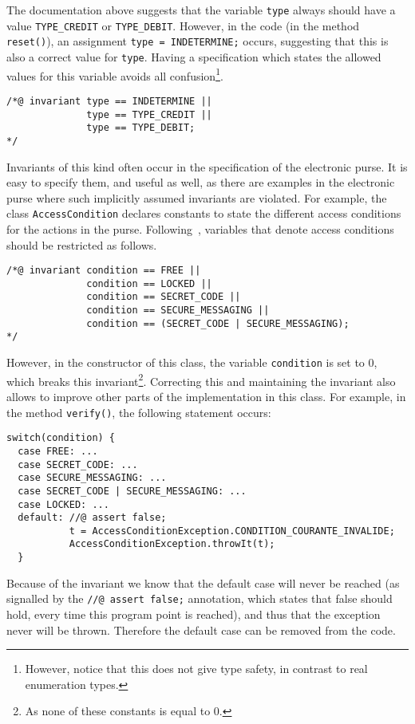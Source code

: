 \documentclass[a4paper]{llncs}
\begin{document}
The documentation above suggests that the variable \texttt{type}
always should have a value \texttt{TYPE\_CREDIT} or
\texttt{TYPE\_DEBIT}. However, in the code (in the method
\texttt{reset()}), an assignment \texttt{type = INDETERMINE;} occurs,
suggesting that this is also a correct value for
\texttt{type}. Having a specification which states the allowed values
for this variable avoids all confusion\footnote{However, notice that
this does not give type safety, in contrast to real enumeration types.}.
\begin{verbatim}
/*@ invariant type == INDETERMINE ||
              type == TYPE_CREDIT || 
              type == TYPE_DEBIT;
*/
\end{verbatim}

Invariants of this kind often occur in the specification of the
electronic purse. It is easy to specify them, and useful as well, as
there are examples in the electronic purse where such implicitly assumed
invariants are violated.
For example, the class \texttt{AccessCondition} declares constants to
state the different access conditions for the actions in the
purse. Following~\cite{BretagneMGL00}, variables that denote access conditions
should be restricted as follows.
\begin{verbatim}
/*@ invariant condition == FREE ||
              condition == LOCKED ||
              condition == SECRET_CODE ||
              condition == SECURE_MESSAGING ||
              condition == (SECRET_CODE | SECURE_MESSAGING);
*/
\end{verbatim}

However, in the constructor of this class, the variable
\texttt{condition} is set to 0, which breaks this
invariant\footnote{As none of these constants is equal to
0.}. Correcting this and maintaining the invariant also allows to
improve other parts of the implementation in this class. For example,
in the method \texttt{verify()}, the following statement occurs:
\begin{verbatim}
switch(condition) {
  case FREE: ...
  case SECRET_CODE: ...
  case SECURE_MESSAGING: ...
  case SECRET_CODE | SECURE_MESSAGING: ...
  case LOCKED: ...
  default: //@ assert false;
           t = AccessConditionException.CONDITION_COURANTE_INVALIDE;
           AccessConditionException.throwIt(t);
  }
\end{verbatim}
Because of the invariant we know that the default case will never
be reached (as signalled by the \texttt{//@ assert false;} annotation,
which states that false should hold, every time this program point is
reached), and thus that the exception never will be thrown. Therefore the
default case can be removed from the code.
\end{document}
